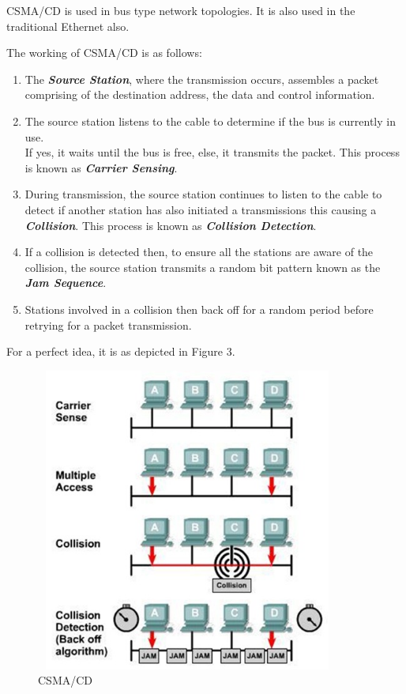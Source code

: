 \documentclass[12pt]{article}
\begin{document}
CSMA/CD is used in bus type network topologies. It is also used in the traditional Ethernet also.

The working of CSMA/CD is as follows:
\begin{enumerate}[label=(\alph*)]
    \item The \textbf{\textit{Source Station}}, where the transmission occurs, assembles a packet comprising of the destination address, the data and control information.
    \item The source station listens to the cable to determine if the bus is currently in use. \\
    If yes, it waits until the bus is free, else, it transmits the packet. This process is known as \textbf{\textit{Carrier Sensing}}.
    \item During transmission, the source station continues to listen to the cable to detect if another station has also initiated a transmissions this causing a \textbf{\textit{Collision}}. This process is known as \textbf{\textit{Collision Detection}}.
    \item If a collision is detected then, to ensure all the stations are aware of the collision, the source station transmits a random bit pattern known as the \textbf{\textit{Jam Sequence}}.
    \item Stations involved in a collision then back off for a random period before retrying for a packet transmission.
\end{enumerate}

For a perfect idea, it is as depicted in Figure 3.

\begin{figure}
    \centering
    \includegraphics[width=10cm, height=10cm]{csma.png}
    \caption{CSMA/CD}
\end{figure}
\end{document}
